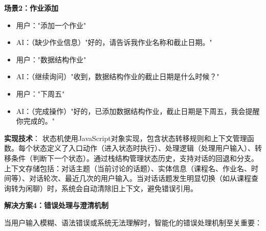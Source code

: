 \documentclass[12pt,a4paper]{article}
\begin{document}
\textbf{场景2：作业添加}
\begin{itemize}
    \item 用户："添加一个作业"
    \item AI：（缺少作业信息）"好的，请告诉我作业名称和截止日期。"
    \item 用户："数据结构作业"
    \item AI：（继续询问）"收到，数据结构作业的截止日期是什么时候？"
    \item 用户："下周五"
    \item AI：（完成操作）"好的，已添加数据结构作业，截止日期是下周五，我会提醒你完成的。"
\end{itemize}

\textbf{实现技术}：
状态机使用JavaScript对象实现，包含状态转移规则和上下文管理函数。每个状态定义了入口动作（进入状态时执行）、处理逻辑（处理用户输入）、转移条件（判断下一个状态）。通过栈结构管理状态历史，支持对话的回退和分支。上下文存储包括：对话主题（当前讨论的话题）、实体信息（课程名、作业名、时间等）、对话轮次、最近几次的用户输入。当对话话题发生明显切换（如从课程查询转为闲聊）时，系统会自动清除旧上下文，避免错误引用。

\textbf{解决方案4：错误处理与澄清机制}

当用户输入模糊、语法错误或系统无法理解时，智能化的错误处理机制至关重要：
\end{document}
